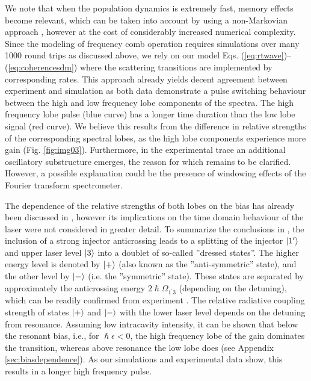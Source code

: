 \documentclass[10pt]{article}
\begin{document}
	We note that when the population dynamics is extremely fast,
	memory effects become relevant, which can be taken into account by using a non-Markovian approach \cite{butscher2005ultrafast, knezevic2013time}, however at the cost of
	considerably increased numerical complexity. Since the modeling of frequency comb
	operation requires simulations over many 1000 round trips as discussed above,
	we rely on our model Eqs. (\ref{eq:rtwave})--(\ref{eq:coherencesdm})
	where the scattering transitions are implemented by corresponding rates.
	This approach already yields decent agreement between experiment and simulation as both data
	demonstrate a pulse switching behaviour between the high and low frequency
	lobe components of the spectra. The high frequency lobe pulse (blue curve) has
	a longer time duration than the low lobe signal (red curve). We believe this
	results from the difference in relative strengths of the corresponding
	spectral lobes, as the high lobe components experience more gain (Fig.
	\ref{fig:img03}). Furthermore, in the experimental trace an additional
	oscillatory substructure emerges, the reason for which remains to be clarified. However, a possible explanation could be 
	the presence of windowing effects of the Fourier transform spectrometer. 

	
	The dependence of the relative strengths of both lobes on the bias\textrm{
	}has already been discussed in \cite{dupont2010simplified}, however its
	implications on the time domain behaviour of the laser were not considered in
	greater detail. To summarize the conclusions in \cite{dupont2010simplified},
	the inclusion of a strong injector anticrossing leads to a splitting of the
	injector $\Ket{1'}$ and upper laser level $\Ket{3}$ into a doublet of
	so-called ''dressed states''. The higher energy level is denoted by $\Ket{+}$
	(also known as the ''anti-symmetric'' state), and the other level by $\Ket{-}$
	(i.e. the ''symmetric'' state). These states are separated by approximately
	the anticrossing energy $2\hslash\Omega_{1^{\prime}3}$ (depending on the
	detuning), which can be readily confirmed from experiment
	\cite{burghoff2014terahertz}. The relative radiative coupling strength of
	states $\Ket{+}$ and $\Ket{-}$ with the lower laser level depends on the
	detuning from resonance. Assuming low intracavity intensity, it can be shown
	that below the resonant bias, i.e., for $\hslash\epsilon<0$, the high frequency
	lobe of the gain dominates the transition, whereas above resonance the low
	lobe does (see Appendix \ref{sec:biasdependence}). As our simulations and
	experimental data show, this results in a longer high frequency pulse.
	
\end{document}
